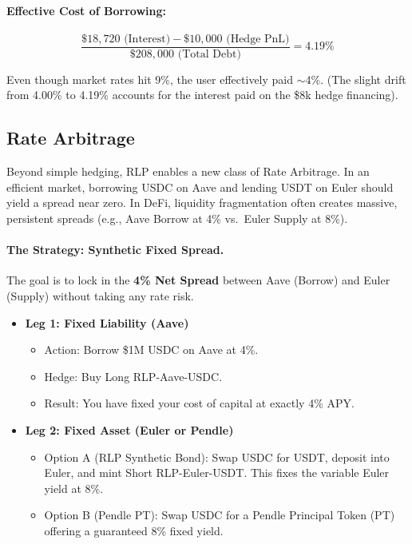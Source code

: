 \documentclass[12pt]{article}
\begin{document}
\paragraph{Effective Cost of Borrowing:}

\begin{equation}
    \frac{\$18{,}720 \text{ (Interest)} - \$10{,}000 \text{ (Hedge PnL)}}{\$208{,}000 \text{ (Total Debt)}} = \mathbf{4.19\%}
\end{equation}

Even though market rates hit 9\%, the user effectively paid $\sim$4\%. (The slight drift from 4.00\% to 4.19\% accounts for the interest paid on the \$8k hedge financing).

\subsection{Rate Arbitrage}

Beyond simple hedging, RLP enables a new class of Rate Arbitrage. In an efficient market, borrowing USDC on Aave and lending USDT on Euler should yield a spread near zero. In DeFi, liquidity fragmentation often creates massive, persistent spreads (e.g., Aave Borrow at 4\% vs.\ Euler Supply at 8\%).

\paragraph{The Strategy: Synthetic Fixed Spread.}
The goal is to lock in the \textbf{4\% Net Spread} between Aave (Borrow) and Euler (Supply) without taking any rate risk.

\begin{itemize}
    \item \textbf{Leg 1: Fixed Liability (Aave)}
    \begin{itemize}
        \item Action: Borrow \$1M USDC on Aave at 4\%.
        \item Hedge: Buy Long RLP-Aave-USDC.
        \item Result: You have fixed your cost of capital at exactly 4\% APY.
    \end{itemize}
    \item \textbf{Leg 2: Fixed Asset (Euler or Pendle)}
    \begin{itemize}
        \item Option A (RLP Synthetic Bond): Swap USDC for USDT, deposit into Euler, and mint Short RLP-Euler-USDT. This fixes the variable Euler yield at 8\%.
        \item Option B (Pendle PT): Swap USDC for a Pendle Principal Token (PT) offering a guaranteed 8\% fixed yield.
    \end{itemize}
\end{itemize}
\end{document}
